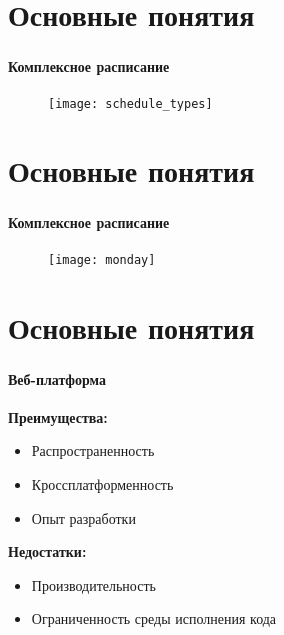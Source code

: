 
\frame[plain]{\titlepage} %


\section{Основные понятия}

\begin{frame}
\frametitle{\insertsection}
\framesubtitle{Комплексное расписание}

\begin{figure}
    \center
    \texttt{[image: schedule\_types]}
\end{figure}
\end{frame}


\section{Основные понятия}

\begin{frame}
\frametitle{\insertsection}
\framesubtitle{Комплексное расписание}

\begin{figure}
    \center
    \texttt{[image: monday]}
\end{figure}
\end{frame}


\section{Основные понятия}

\begin{frame}
\frametitle{\insertsection}
\framesubtitle{Веб-платформа}

\textbf{Преимущества:}
\begin{itemize}
    \item Распространенность
    \item Кроссплатформенность
    \item Опыт разработки
\end{itemize}

\textbf{Недостатки:}
\begin{itemize}
    \item Производительность
    \item Ограниченность среды исполнения кода
\end{itemize}

\end{frame}

